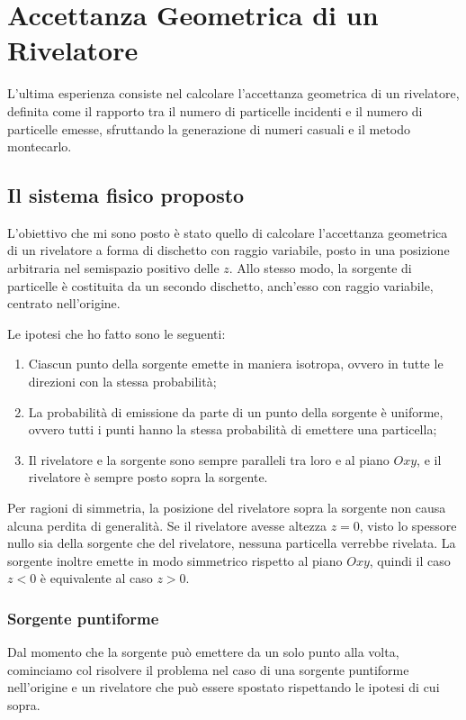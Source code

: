 \chapter{Accettanza Geometrica di un Rivelatore}\label{ch:acc}
    L'ultima esperienza consiste nel calcolare l'accettanza geometrica di un rivelatore, definita come il rapporto tra il numero di particelle incidenti e il numero di particelle emesse, sfruttando la generazione di numeri casuali e il metodo montecarlo.

    \section{Il sistema fisico proposto}
        L'obiettivo che mi sono posto è stato quello di calcolare l'accettanza geometrica di un rivelatore a forma di dischetto con raggio variabile, posto in una posizione arbitraria nel semispazio positivo delle $z$. Allo stesso modo, la sorgente di particelle è costituita da un secondo dischetto, anch'esso con raggio variabile, centrato nell'origine.

        Le ipotesi che ho fatto sono le seguenti:
        \begin{enumerate}
            \item Ciascun punto della sorgente emette in maniera isotropa, ovvero in tutte le direzioni con la stessa probabilità;
            \item La probabilità di emissione da parte di un punto della sorgente è uniforme, ovvero tutti i punti hanno la stessa probabilità di emettere una particella;
            \item Il rivelatore e la sorgente sono sempre paralleli tra loro e al piano $Oxy$, e il rivelatore è sempre posto sopra la sorgente.
        \end{enumerate}

        Per ragioni di simmetria, la posizione del rivelatore sopra la sorgente non causa alcuna perdita di generalità. Se il rivelatore avesse altezza $z=0$, visto lo spessore nullo sia della sorgente che del rivelatore, nessuna particella verrebbe rivelata. La sorgente inoltre emette in modo simmetrico rispetto al piano $Oxy$, quindi il caso $z<0$ è equivalente al caso $z>0$.

        \subsection{Sorgente puntiforme}\label{ss:acc:sorgente-puntiforme}
            Dal momento che la sorgente può emettere da un solo punto alla volta, cominciamo col risolvere il problema nel caso di una sorgente puntiforme nell'origine e un rivelatore che può essere spostato rispettando le ipotesi di cui sopra. 
            
